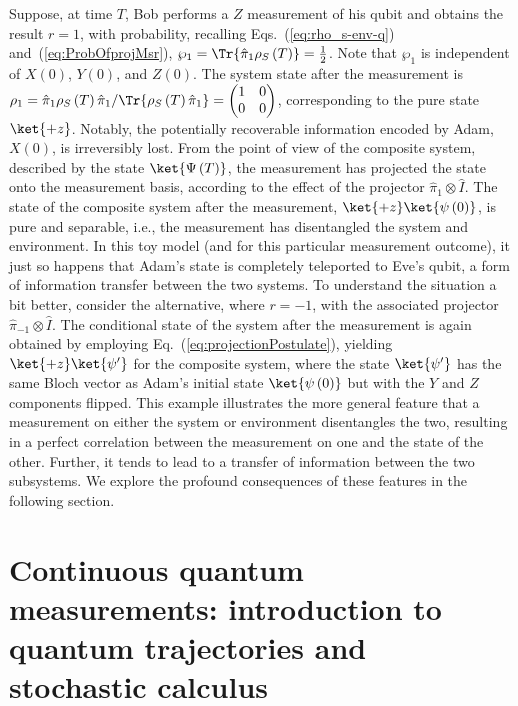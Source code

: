 Suppose, at time $T$, Bob performs a $Z$ measurement of his qubit
and obtains the result $r=1$, with probability, recalling Eqs.~(\ref{eq:rho_s-env-q})
and~(\ref{eq:ProbOfprojMsr}), $\wp_{1}=\Tr{\hat{\pi}_{1}\rho_{S}\left(T\right)}=\frac{1}{2}$.
Note that $\wp_{1}$ is independent of $X\left(0\right)$, $Y\left(0\right)$,
and $Z\left(0\right)$. The system state after the measurement is
$\rho_{1}=\hat{\pi}_{1}\rho_{S}\left(T\right)\hat{\pi}_{1}/\Tr{\rho_{S}\left(T\right)\hat{\pi}_{1}}=\begin{pmatrix}1 & 0\\
0 & 0
\end{pmatrix}$, corresponding to the pure state $\ket{+z}$. Notably, the potentially
recoverable information encoded by Adam, $X(0)$, is irreversibly
lost. From the point of view of the composite system, described by
the state $\ket{\Psi\left(T\right)}$, the measurement has projected
the state onto the measurement basis, according to the effect of the
projector $\hat{\pi}_{1}\otimes\hat{I}$. The state of the composite
system after the measurement, $\ket{+z}\ket{\psi\left(0\right)}$,
is pure and separable, i.e., the measurement has disentangled the
system and environment. In this toy model (and for this particular
measurement outcome), it just so happens that Adam's state is completely
teleported to Eve's qubit, a form of information transfer between
the two systems. To understand the situation a bit better, consider
the alternative, where $r=-1$, with the associated projector $\hat{\pi}_{-1}\otimes\hat{I}$.
The conditional state of the system after the measurement is again
obtained by employing Eq.~(\ref{eq:projectionPostulate}), yielding
$\ket{+z}\ket{\psi'}$ for the composite system, where the state $\ket{\psi'}$
has the same Bloch vector as Adam's initial state $\ket{\psi\left(0\right)}$
but with the $Y$ and $Z$ components flipped. This example illustrates
the more general feature that a measurement on either the system or
environment disentangles the two, resulting in a perfect correlation
between the measurement on one and the state of the other. Further,
it tends to lead to a transfer of information between the two subsystems.
We explore the profound consequences of these features in the following
section.


\section{Continuous quantum measurements: introduction to quantum trajectories
and stochastic calculus \label{sec:Introductory-example:-qubit} }

